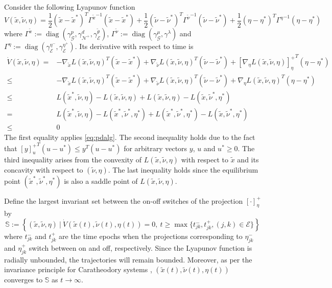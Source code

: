 \documentclass[journal,12pt,onecolumn,draftclsnofoot]{IEEEtran}
\newcommand{\diag}{\mathop{\mathrm{diag}}}
\newcommand{\beq}{\begin{equation}}
\newcommand{\eeq}{\end{equation}}
\begin{document}
	Consider the following Lyapunov function 
	\beq
	V(\tilde x, \tilde \nu, \eta) = \frac{1}{2} (\tilde{x}-\tilde x^* )^T {\Gamma^{\tilde{x}}}^{-1} (\tilde{x}-\tilde x^* ) + \frac{1}{2} (\tilde{\nu}-\tilde \nu^* )^T {\Gamma^{\tilde{\nu}}}^{-1} (\tilde{\nu}-\tilde \nu^* ) +  \frac{1}{2} (\eta-\eta^* )^T {\Gamma^{\eta}}^{-1}(\eta-\eta^* )
	\eeq
	where $\Gamma^{\tilde{x}}:=\diag(\gamma^p_{\mathcal{G}}, \gamma^d_{\mathcal{N}^+},\gamma^{\tilde\theta}_{\mathcal{E}})$, $\Gamma^{\tilde{\nu}}:=\diag( \gamma^\mu_\mathcal{G},\gamma^\lambda)$ and $\Gamma^\eta:=\diag(\gamma^{\eta^-}_\mathcal{E},\gamma^{\eta^+}_\mathcal{E})$. Its derivative with respect to time is 
	\beq
	\begin{split}
		\dot V(\tilde x, \tilde \nu,\eta) = & -\nabla_{\tilde x}{ L} (\tilde x, \tilde \nu,\eta)^T(\tilde{x}-\tilde x^* ) + \nabla_{ \tilde \nu} L (\tilde x, \tilde \nu,\eta)^T(\tilde{\nu}-\tilde \nu^* )+  {\left[\nabla_{\eta} L(\tilde x, \tilde \nu,\eta)\right ]^+_{\eta}}^T (\eta- \eta^*) \\
		\le & -\nabla_{\tilde x}{ L} (\tilde x, \tilde \nu,\eta)^T(\tilde{x}-\tilde x^* ) + \nabla_{ \tilde \nu} L (\tilde x, \tilde \nu,\eta)^T(\tilde{\nu}-\tilde \nu^* )+  {\nabla_{\eta} L(\tilde x, \tilde \nu,\eta)}^T (\eta- \eta^*)  \\
		\le &   L(\tilde{x}^*, \tilde \nu, \eta) - L(\tilde{x},\tilde{\nu},\eta) +  L(\tilde{x},\tilde{\nu},\eta) - L(\tilde x,\tilde{\nu}^*,\eta^*) \\
		= &   L(\tilde{x}^*, \tilde \nu, \eta) - L(\tilde{x}^*,\tilde{\nu}^*,\eta^*) +  L(\tilde{x}^*,\tilde{\nu}^*,\eta^*) - L(\tilde x,\tilde{\nu}^*,\eta^*) \\
		\le & 0
	\end{split}
	\eeq
	The first equality applies \eqref{eq:pdalg}. The second inequality holds due to the fact that ${[y]_u^+}^T (u-u^*)\le y^T(u-u^*)$ for arbitrary vectors $y$, $u$ and $u^*\ge 0$. The third inequality arises from the convexity of $L(\tilde{x},\tilde{\nu},\eta)$ with respect to $\tilde{x}$ and its concavity with respect to $(\tilde{\nu},\eta)$. The last inequality holds since the equilibrium point $(\tilde{x}^*,\tilde{\nu}^*,\eta^*)$ is also a saddle point of $L(\tilde{x},\tilde{\nu},\eta)$.
	
	Define the largest invariant set between the on-off switches of the projection $[\cdot]_\eta^+$ by 
	\beq
	\mathbb{S}:=\left\{  (\tilde x, \tilde \nu, \eta) \ | \ \dot{V}(\tilde x(t), \tilde \nu(t), \eta(t)) = 0 ,\   t\ge \max\{ t^-_{jk},t^+_{jk}, (j,k)\in\mathcal{E}\} \right\}
	\eeq
	where $t_{jk}^-$ and $t_{jk}^+$ are the time epochs when the projections corresponding to $\eta_{jk}^-$ and $\eta_{jk}^+$ switch between on and off, respectively. Since the Lyapunov function is radially unbounded, the trajectories will remain bounded. Moreover, as per the invariance principle for Caratheodory systems \cite{bacciotti2006nonpathological}, $(\tilde x(t), \tilde \nu(t), \eta(t))$ converges to $\mathbb{S}$ as $t\rightarrow \infty$.
	
\end{document}
